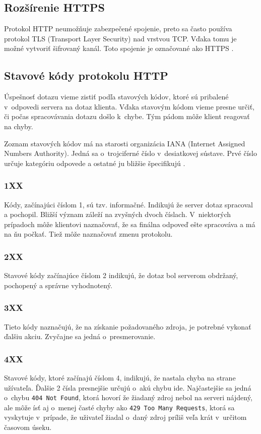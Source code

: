 \documentclass[zadani,slovak]{fitthesis}
\begin{document}
\subsection{Rozšírenie HTTPS}
Protokol HTTP neumožňuje zabezpečené spojenie, preto sa často používa protokol TLS (Transport Layer Security) nad vrstvou TCP. Vďaka tomu je možné vytvoriť šifrovaný kanál. Toto spojenie je označované ako HTTPS \cite{httpsRFC}.


\subsection{Stavové kódy protokolu HTTP}
Úspešnosť dotazu vieme zistiť podľa stavových kódov, ktoré sú pribalené v~odpovedi servera na dotaz klienta. Vďaka stavovým kódom vieme presne určiť, či počas spracovávania dotazu došlo k~chybe. Tým pádom môže klient reagovať na chyby.

Zoznam stavových kódov má na starosti organizácia IANA (Internet Assigned Numbers Authority). Jedná sa o~trojciferné číslo v~desiatkovej sústave. Prvé číslo určuje kategóriu odpovede a ostatné ju bližšie špecifikujú \cite{shiflett2003http}.

\subsubsection{1XX}
Kódy, začínajúci číslom 1, sú tzv. informačné. Indikujú že server dotaz spracoval a pochopil. Bližší význam záleží na zvyšných dvoch číslach. V~niektorých prípadoch môže klientovi naznačovať, že sa finálna odpoveď ešte spracováva a má na ňu počkať. Tiež môže naznačovať zmenu protokolu.

\label{2XX}
\subsubsection{2XX}
Stavové kódy začínajúce číslom 2 indikujú, že dotaz bol serverom obdržaný, pochopený a správne vyhodnotený.

\subsubsection{3XX}
Tieto kódy naznačujú, že na získanie požadovaného zdroja, je potrebné vykonať ďalšiu akciu. Zvyčajne sa jedná o~presmerovanie.

\label{4XX}
\subsubsection{4XX}
Stavové kódy, ktoré začínajú číslom 4, indikujú, že nastala chyba na strane užívateľa. Ďalšie 2 čísla presnejšie určujú o~akú chybu ide. Najčastejšie sa jedná o~chybu \texttt{404 Not Found}, ktorá hovorí že žiadaný zdroj nebol na serveri nájdený, ale môže ísť aj o~menej časté chyby ako \texttt{429 Too Many Requests}, ktorá sa vyskytuje v~prípade, že uživateľ žiadal o~daný zdroj príliš veľa krát v~určitom časovom úseku.
\end{document}
